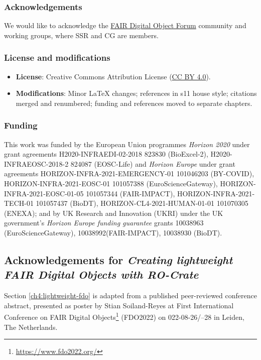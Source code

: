 \subsubsection*{Acknowledgements}

We would like to acknowledge the \href{https://fairdo.org/}{FAIR Digital Object Forum} community and working groups, where SSR and CG are members.

\subsubsection*{License and modifications}

\begin{itemize}
\tightlist
\item
  \textbf{License}: Creative Commons Attribution License
  (\href{https://spdx.org/licenses/CC-BY-4.0}{CC BY 4.0}).
\item
  \textbf{Modifications}: Minor LaTeX changes; references in s11 house style; 
  citations merged and renumbered; 
  funding and references moved to separate chapters.
\end{itemize}

\subsubsection*{Funding}

This work was funded by the European Union programmes \emph{Horizon 2020} under grant agreements H2020-INFRAEDI-02-2018 823830 (BioExcel-2), H2020-INFRAEOSC-2018-2 824087 (EOSC-Life) and \emph{Horizon Europe} under grant agreements HORIZON-INFRA-2021-EMERGENCY-01 101046203 (BY-COVID), HORIZON-INFRA-2021-EOSC-01 101057388 (EuroScienceGateway), HORIZON-INFRA-2021-EOSC-01-05 101057344 (FAIR-IMPACT), HORIZON-INFRA-2021-TECH-01 101057437 (BioDT), HORIZON-CL4-2021-HUMAN-01-01 101070305 (ENEXA); and by UK Research and Innovation (UKRI) under the UK government’s \emph{Horizon Europe funding guarantee} grants 10038963 (EuroScienceGateway), 10038992(FAIR-IMPACT), 10038930 (BioDT).



\subsection{Acknowledgements for \textit{Creating lightweight FAIR Digital Objects with RO-Crate}}

Section \vref{ch4:lightweight-fdo} is adapted from a published peer-reviewed conference abstract,
presented as poster by Stian Soiland-Reyes at 
First International Conference on FAIR Digital Objects\footnote{\url{https://www.fdo2022.org/}} 
(FDO2022) on
022-08-26/--28 in Leiden, The Netherlands. 

